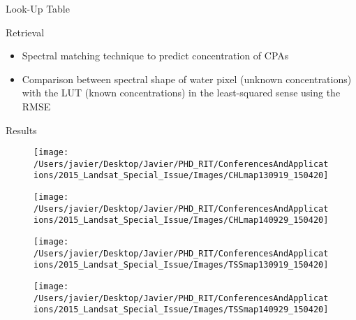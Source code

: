 \documentclass{beamer}
\begin{document}
\begin{frame}{}
\begin{columns}[t]
\begin{column}{.31\linewidth}
\begin{block}{Look-Up Table}
\begin{figure}[htb]
\end{figure}


\end{block}
\begin{block}{Retrieval}
  \begin{itemize}
    \item Spectral matching technique to predict concentration of CPAs
    \vspace{0.5cm}
    \item Comparison between spectral shape of water pixel (unknown concentrations) with the LUT (known concentrations) in the least-squared sense using the RMSE
  \end{itemize}
\end{block}

\begin{block}{Results}

\begin{figure}[htbp!]
  \begin{minipage}[c]{0.46\linewidth}
      \centering
      \texttt{[image: /Users/javier/Desktop/Javier/PHD\_RIT/ConferencesAndApplications/2015\_Landsat\_Special\_Issue/Images/CHLmap130919\_150420]}  
  \end{minipage}
  \hspace{1cm}
  \begin{minipage}[c]{0.46\linewidth}
      \centering
      \texttt{[image: /Users/javier/Desktop/Javier/PHD\_RIT/ConferencesAndApplications/2015\_Landsat\_Special\_Issue/Images/CHLmap140929\_150420]}  
  \end{minipage}
% 
  \begin{minipage}[c]{0.46\linewidth}
      \centering
      \texttt{[image: /Users/javier/Desktop/Javier/PHD\_RIT/ConferencesAndApplications/2015\_Landsat\_Special\_Issue/Images/TSSmap130919\_150420]}  
  \end{minipage}
  \hspace{1cm}
  \begin{minipage}[c]{0.46\linewidth}
      \centering
      \texttt{[image: /Users/javier/Desktop/Javier/PHD\_RIT/ConferencesAndApplications/2015\_Landsat\_Special\_Issue/Images/TSSmap140929\_150420]}  
  \end{minipage}


\end{figure}
\end{block}
\end{column}
\end{columns}
\end{frame}
\end{document}
